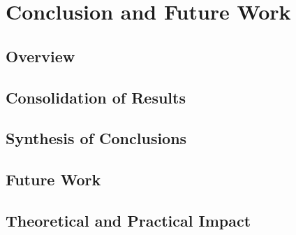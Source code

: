 \chapter{Conclusion and Future Work}
    \section{Overview}
    \section{Consolidation of Results}
    \section{Synthesis of Conclusions}
    \section{Future Work}
    \section{Theoretical and Practical Impact}